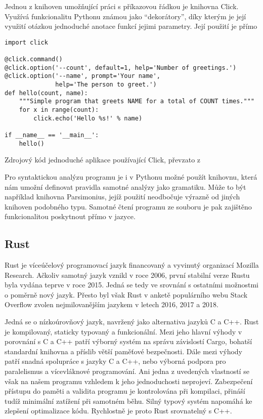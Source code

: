 Jednou z knihoven umožňující práci s příkazovou řádkou je knihovna Click\cite{website-click}. Využívá funkcionalitu Pythonu známou jako ``dekorátory'', díky kterým je její využití otázkou jednoduché anotace funkcí jejimi parametry. Její použití je přímo

\begin{listing}
\begin{verbatim}
import click

@click.command()
@click.option('--count', default=1, help='Number of greetings.')
@click.option('--name', prompt='Your name',
              help='The person to greet.')
def hello(count, name):
    """Simple program that greets NAME for a total of COUNT times."""
    for x in range(count):
        click.echo('Hello %s!' % name)

if __name__ == '__main__':
    hello()
\end{verbatim}
\caption{Zdrojový kód jednoduché aplikace používající Click, převzato z \cite{website-click}}
\label{fig:click-source}
\end{listing}

Pro syntaktickou analýzu programu je i v Pythonu možné použít knihovnu, která nám umožní definovat pravidla samotné analýzy jako gramatiku. Může to být například knihovna Parsimonius\cite{github-parsimonious}, jejíž použití neodbočuje výrazně od jiných knihoven podobného typu. Samotné čtení programu ze souboru je pak zajištěno funkcionalitou poskytnout přímo v jazyce.

\subsection{Rust}
\label{assembler:rust}

Rust je víceúčelový programovací jazyk financovaný a vyvinutý organizací Mozilla Research\cite{rust-faq}. Ačkoliv samotný jazyk vznikl v roce 2006\cite{rust-faq}, první stabilní verze Rustu byla vydána teprve v roce 2015\cite{rust-faq}. Jedná se tedy ve srovnání s ostatními možnostmi o poměrně nový jazyk. Přesto byl však Rust v anketě populárního webu Stack Overflow zvolen nejmilovanějším jazykem v letech 2016\cite{so-survey-2016}, 2017\cite{so-survey-2017} a 2018\cite{so-survey-2018}.

Jedná se o nízkoúrovňový jazyk, navržený jako alternativa jazyků C a C++. Rust je kompilovaný, staticky typovaný a funkcionální\cite{rust-faq}. Mezi jeho hlavní výhody v porovnání s C a C++ patří výborný systém na správu závislostí Cargo, bohatší standardní knihovna a příslib větší paměťové bezpečnosti. Dále mezi výhody patří snadná spolupráce s jazyky C a C++, nebo výborná podpora pro paralelismus a vícevláknové programování. Ani jedna z uvedených vlastností se však na našem programu vzhledem k jeho jednoduchosti neprojeví. Zabezpečení přístupu do paměti a validita programu je kontrolována při kompilaci\cite{rust-faq}, přináší tudíž minimální zatížení při samotném běhu. Silný typový systém napomáhá ke zlepšení optimalizace kódu. Rychlostně je proto Rust srovnatelný s C++\cite{rust-vs-cpp}.

